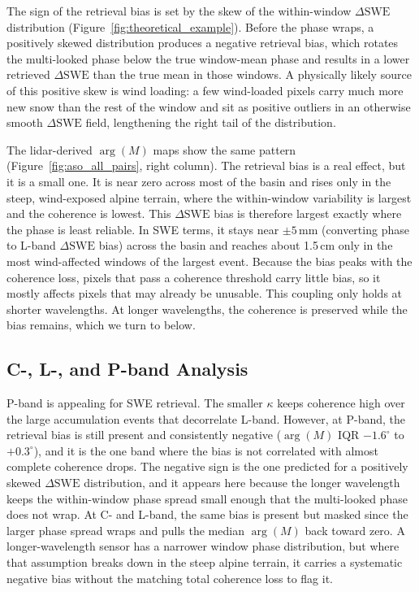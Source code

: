 \documentclass[tc, manuscript]{copernicus}
\begin{document}
The sign of the retrieval bias is set by the skew of the within-window $\Delta\mathrm{SWE}$ distribution (Figure~\ref{fig:theoretical_example}). Before the phase wraps, a positively skewed distribution produces a negative retrieval bias, which rotates the multi-looked phase below the true window-mean phase and results in a lower retrieved  $\Delta\mathrm{SWE}$ than the true mean in those windows. A physically likely source of this positive skew is wind loading: a few wind-loaded pixels carry much more new snow than the rest of the window and sit as positive outliers in an otherwise smooth $\Delta\mathrm{SWE}$ field, lengthening the right tail of the distribution.

The lidar-derived $\arg(M)$ maps show the same pattern (Figure~\ref{fig:aso_all_pairs}, right column). The retrieval bias is a real effect, but it is a small one. It is near zero across most of the basin and rises only in the steep, wind-exposed alpine terrain, where the within-window variability is largest and the coherence is lowest. This $\Delta\mathrm{SWE}$ bias is therefore largest exactly where the phase is least reliable. In SWE terms, it stays near $\pm5$\,\unit{mm} (converting phase to L-band $\Delta\mathrm{SWE}$ bias) across the basin and reaches about 1.5\,\unit{cm} only in the most wind-affected windows of the largest event. Because the bias peaks with the coherence loss, pixels that pass a coherence threshold carry little bias, so it mostly affects pixels that may already be unusable. This coupling only holds at shorter wavelengths. At longer wavelengths, the coherence is preserved while the bias remains, which we turn to below.

\subsection{C-, L-, and P-band Analysis}\label{subsec:band-analysis}

P-band is appealing for SWE retrieval. The smaller $\kappa$ keeps coherence high over the large accumulation events that decorrelate L-band. However, at P-band, the retrieval bias is still present and consistently negative ($\arg(M)$ IQR $-1.6^\circ$ to $+0.3^\circ$), and it is the one band where the bias is not correlated with almost complete coherence drops. The negative sign is the one predicted for a positively skewed $\Delta\mathrm{SWE}$ distribution, and it appears here because the longer wavelength keeps the within-window phase spread small enough that the multi-looked phase does not wrap. At C- and L-band, the same bias is present but masked since the larger phase spread wraps and pulls the median $\arg(M)$ back toward zero. A longer-wavelength sensor has a narrower window phase distribution, but where that assumption breaks down in the steep alpine terrain, it carries a systematic negative bias without the matching total coherence loss to flag it.
\end{document}
